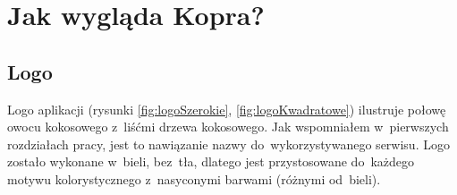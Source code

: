\documentclass[a4paper,twoside,titlepage,openright]{book}
\begin{document}
\section{Jak wygląda Kopra?}

\subsection{Logo}

Logo aplikacji (rysunki \ref{fig:logoSzerokie}, \ref{fig:logoKwadratowe}) ilustruje połowę owocu kokosowego z~liśćmi drzewa kokosowego. Jak wspomniałem w~pierwszych rozdziałach pracy, jest to nawiązanie nazwy do~wykorzystywanego serwisu. Logo zostało wykonane w~bieli, bez~tła, dlatego jest przystosowane do~każdego motywu kolorystycznego z~nasyconymi barwami (różnymi od~bieli).
\end{document}
